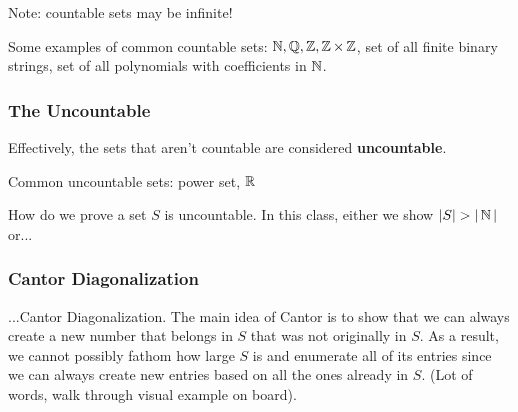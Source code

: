 Note: countable sets may be infinite!

Some examples of common countable sets: $\operatorname{\mathbb{N}}, \operatorname{\mathbb{Q}}, \operatorname{\mathbb{Z}}, \operatorname{\mathbb{Z}} \times \operatorname{\mathbb{Z}}$, set of all finite binary strings, set of all polynomials with coefficients in $\operatorname{\mathbb{N}}$. 

\subsubsection{The Uncountable}
Effectively, the sets that aren't countable are considered \textbf{uncountable}. 

Common uncountable sets: power set, $\operatorname{\mathbb{R}}$

How do we prove a set $S$ is uncountable. In this class, either we show $|S| > |\operatorname{\mathbb{N}}|$ or... 

\subsubsection{Cantor Diagonalization}
...Cantor Diagonalization. The main idea of Cantor is to show that we can always create a new number that belongs in $S$ that was not originally in $S$. As a result, we cannot possibly fathom how large $S$ is and enumerate all of its entries since we can always create new entries based on all the ones already in $S$. (Lot of words, walk through visual example on board). 